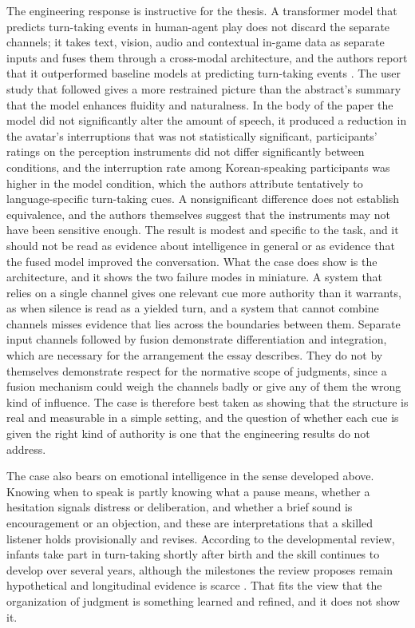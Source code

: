 \documentclass[12pt, a4paper]{article}
\begin{document}
The engineering response is instructive for the thesis. A transformer model that predicts turn-taking events in human-agent play does not discard the separate channels; it takes text, vision, audio and contextual in-game data as separate inputs and fuses them through a cross-modal architecture, and the authors report that it outperformed baseline models at predicting turn-taking events \citep{bae2025}. The user study that followed gives a more restrained picture than the abstract's summary that the model enhances fluidity and naturalness. In the body of the paper the model did not significantly alter the amount of speech, it produced a reduction in the avatar's interruptions that was not statistically significant, participants' ratings on the perception instruments did not differ significantly between conditions, and the interruption rate among Korean-speaking participants was higher in the model condition, which the authors attribute tentatively to language-specific turn-taking cues. A nonsignificant difference does not establish equivalence, and the authors themselves suggest that the instruments may not have been sensitive enough. The result is modest and specific to the task, and it should not be read as evidence about intelligence in general or as evidence that the fused model improved the conversation. What the case does show is the architecture, and it shows the two failure modes in miniature. A system that relies on a single channel gives one relevant cue more authority than it warrants, as when silence is read as a yielded turn, and a system that cannot combine channels misses evidence that lies across the boundaries between them. Separate input channels followed by fusion demonstrate differentiation and integration, which are necessary for the arrangement the essay describes. They do not by themselves demonstrate respect for the normative scope of judgments, since a fusion mechanism could weigh the channels badly or give any of them the wrong kind of influence. The case is therefore best taken as showing that the structure is real and measurable in a simple setting, and the question of whether each cue is given the right kind of authority is one that the engineering results do not address.

The case also bears on emotional intelligence in the sense developed above. Knowing when to speak is partly knowing what a pause means, whether a hesitation signals distress or deliberation, and whether a brief sound is encouragement or an objection, and these are interpretations that a skilled listener holds provisionally and revises. According to the developmental review, infants take part in turn-taking shortly after birth and the skill continues to develop over several years, although the milestones the review proposes remain hypothetical and longitudinal evidence is scarce \citep{cosper2025}. That fits the view that the organization of judgment is something learned and refined, and it does not show it.
\end{document}

